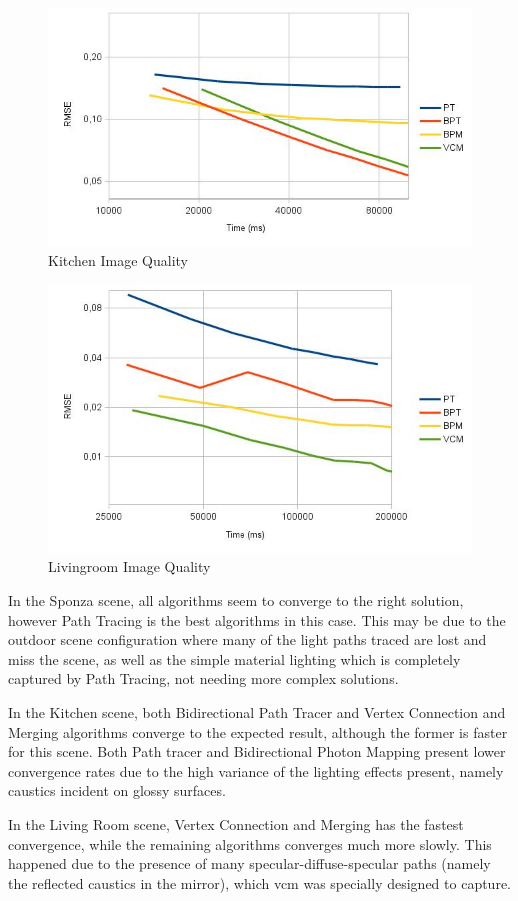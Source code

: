 \begin{figure}[H]
\centering
\includegraphics[width=0.8\linewidth]{img/kitchenImgq.jpg}
\caption{\label{img:kitchenImgq} Kitchen Image Quality}
\end{figure}

\begin{figure}[H]
\centering
\includegraphics[width=0.8\linewidth]{img/livingroomImgq.jpg}
\caption{\label{img:livingroomImgq} Livingroom Image Quality}
\end{figure}

In the Sponza scene, all algorithms seem to converge to the right solution, however Path Tracing is the best algorithms in this case. This may be due to the outdoor scene configuration where many of the light paths traced are lost and miss the scene, as well as the simple material lighting which is completely captured by Path Tracing, not needing more complex solutions.

In the Kitchen scene, both Bidirectional Path Tracer and Vertex Connection and Merging algorithms converge to the expected result, although the former is faster for this scene. Both Path tracer and Bidirectional Photon Mapping present lower convergence rates due to the high variance of the lighting effects present, namely caustics incident on glossy surfaces.

In the Living Room scene, Vertex Connection and Merging has the fastest convergence, while the remaining algorithms converges much more slowly. This happened due to the presence of many specular-diffuse-specular paths (namely the reflected caustics in the mirror), which \gls{vcm} was specially designed to capture.
